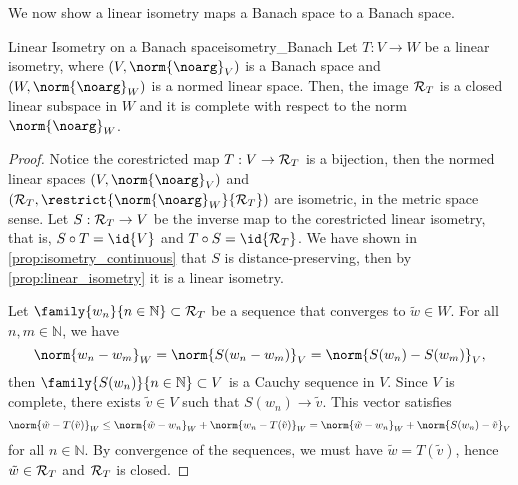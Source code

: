 We now show a linear isometry maps a Banach space to a Banach space.
\begin{proposition}{Linear Isometry on a Banach space}{isometry_Banach}
    Let \(T : V \to W\) be a linear isometry, where \((V, \norm{\noarg}_V)\) is a Banach space and \((W, \norm{\noarg}_W)\) is a normed linear space. Then, the image \(\mathcal{R}_{T}\) is a closed linear subspace in \(W\) and it is complete with respect to the norm \(\norm{\noarg}_W\).
\end{proposition}
\begin{proof}
    Notice the corestricted map \(T : V \to \mathcal{R}_{T}\) is a bijection, then the normed linear spaces \((V, \norm{\noarg}_V)\) and \((\range{T}, \restrict{\norm{\noarg}_W}{\range{T}})\) are isometric, in the metric space sense. Let \(S : \mathcal{R}_{T} \to V\) be the inverse map to the corestricted linear isometry, that is, \(S \circ T = \id{V}\) and \(T \circ S = \id{\range{T}}\). We have shown in \cref{prop:isometry_continuous} that \(S\) is distance-preserving, then by \cref{prop:linear_isometry} it is a linear isometry.

    Let \(\family{w_n}{n\in \mathbb{N}} \subset \range{T}\) be a sequence that converges to \(\tilde{w} \in W\). For all \(n, m \in \mathbb{N}\), we have
    \begin{equation*}
        \norm{w_n - w_m}_W = \norm{S(w_n - w_m)}_V = \norm{S(w_n)-S(w_m)}_V,
    \end{equation*}
    then \(\family{S(w_n)}{n\in \mathbb{N}} \subset V\) is a Cauchy sequence in \(V\). Since \(V\) is complete, there exists \(\tilde{v} \in V\) such that \(S(w_n) \to \tilde{v}\). This vector satisfies
    \begin{equation*}
        \norm{\tilde{w} - T(\tilde{v})}_W \leq \norm{\tilde{w} - w_n}_W + \norm{w_n - T(\tilde{v})}_W = \norm{\tilde{w} - w_n}_W + \norm{S(w_n) - \tilde{v}}_V
    \end{equation*}
    for all \(n \in \mathbb{N}\). By convergence of the sequences, we must have \(\tilde{w} = T(\tilde{v})\), hence \(\tilde{w} \in \mathcal{R}_{T}\) and \(\mathcal{R}_{T}\) is closed.


\end{proof}
